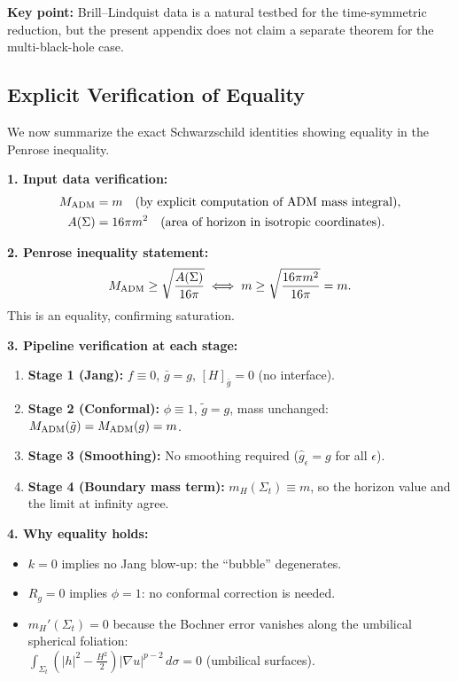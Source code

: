\textbf{Key point:} Brill--Lindquist data is a natural testbed for the time-symmetric reduction, but the present appendix does not claim a separate theorem for the multi-black-hole case.

\subsection{Explicit Verification of Equality}
We now summarize the exact Schwarzschild identities showing equality in the Penrose inequality.

\textbf{1. Input data verification:}
\begin{align}
    M_{\mathrm{ADM}} &= m \quad \text{(by explicit computation of ADM mass integral)}, \\
    A(\Sigma) &= 16\pi m^2 \quad \text{(area of horizon in isotropic coordinates)}.
\end{align}

\textbf{2. Penrose inequality statement:}
\begin{equation}
    M_{\mathrm{ADM}} \ge \sqrt{\frac{A(\Sigma)}{16\pi}} \iff m \ge \sqrt{\frac{16\pi m^2}{16\pi}} = m.
\end{equation}
This is an equality, confirming saturation.

\textbf{3. Pipeline verification at each stage:}
\begin{enumerate}
    \item \textbf{Stage 1 (Jang):} $f \equiv 0$, $\bar{g} = g$, $[H]_{\bar{g}} = 0$ (no interface). \checkmark
    \item \textbf{Stage 2 (Conformal):} $\phi \equiv 1$, $\tilde{g} = g$, mass unchanged: $M_{\mathrm{ADM}}(\tilde{g}) = M_{\mathrm{ADM}}(g) = m$. \checkmark
    \item \textbf{Stage 3 (Smoothing):} No smoothing required ($\hat{g}_\epsilon = g$ for all $\epsilon$). \checkmark
    \item \textbf{Stage 4 (Boundary mass term):} $m_H(\Sigma_t) \equiv m$, so the horizon value and the limit at infinity agree. \checkmark
\end{enumerate}

\textbf{4. Why equality holds:}
\begin{itemize}
    \item $k = 0$ implies no Jang blow-up: the ``bubble'' degenerates.
    \item $R_g = 0$ implies $\phi = 1$: no conformal correction is needed.
    \item $m_H'(\Sigma_t) = 0$ because the Bochner error vanishes along the umbilical spherical foliation: \\
    $\displaystyle \int_{\Sigma_t} \left( |h|^2 - \frac{H^2}{2} \right) |\nabla u|^{p-2} \, d\sigma = 0$ \quad (umbilical surfaces).
\end{itemize}

